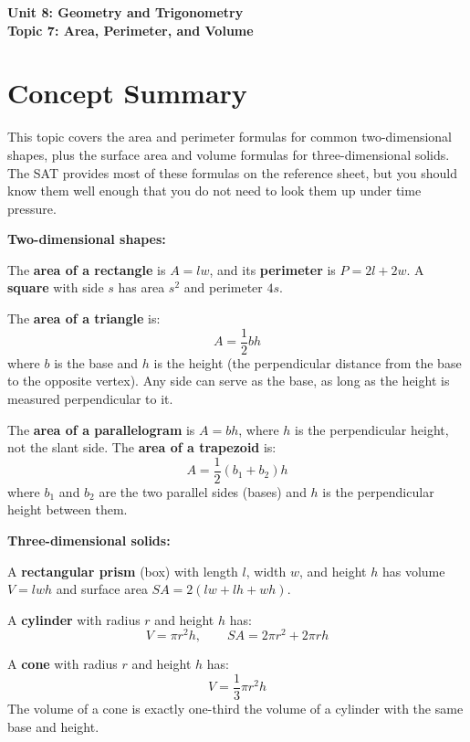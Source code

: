 \documentclass[14pt]{extarticle}
\begin{document}
\raggedright
{}

\begin{center}
    \LARGE \textbf{Unit 8: Geometry and Trigonometry} \\[6pt]
    \Large \textbf{Topic 7: Area, Perimeter, and Volume}
\end{center}

\vspace{1em}

\section*{Concept Summary}

This topic covers the area and perimeter formulas for common two-dimensional shapes, plus the surface area and volume formulas for three-dimensional solids. The SAT provides most of these formulas on the reference sheet, but you should know them well enough that you do not need to look them up under time pressure.

\textbf{Two-dimensional shapes:}

The \textbf{area of a rectangle} is \(A = lw\), and its \textbf{perimeter} is \(P = 2l + 2w\). A \textbf{square} with side \(s\) has area \(s^2\) and perimeter \(4s\).

The \textbf{area of a triangle} is:
\[
A = \frac{1}{2}bh
\]
where \(b\) is the base and \(h\) is the height (the perpendicular distance from the base to the opposite vertex). Any side can serve as the base, as long as the height is measured perpendicular to it.

The \textbf{area of a parallelogram} is \(A = bh\), where \(h\) is the perpendicular height, not the slant side. The \textbf{area of a trapezoid} is:
\[
A = \frac{1}{2}(b_1 + b_2)h
\]
where \(b_1\) and \(b_2\) are the two parallel sides (bases) and \(h\) is the perpendicular height between them.

\textbf{Three-dimensional solids:}

A \textbf{rectangular prism} (box) with length \(l\), width \(w\), and height \(h\) has volume \(V = lwh\) and surface area \(SA = 2(lw + lh + wh)\).

A \textbf{cylinder} with radius \(r\) and height \(h\) has:
\[
V = \pi r^2 h, \qquad SA = 2\pi r^2 + 2\pi r h
\]

A \textbf{cone} with radius \(r\) and height \(h\) has:
\[
V = \frac{1}{3}\pi r^2 h
\]
The volume of a cone is exactly one-third the volume of a cylinder with the same base and height.
\end{document}
